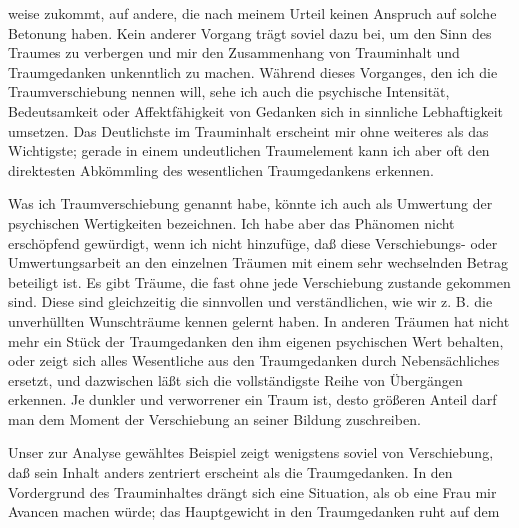 \documentclass[twoside=true,titlepage=false,open=any, parskip=never, fontsize=10pt, headings=small, chapterprefix=false, appendixprefix=false]{scrbook}
\begin{document}
         
            
            
            
        \pstart
        weise zukommt, auf andere, die nach meinem
                  Urteil keinen Anspruch auf solche Betonung haben. Kein anderer Vorgang trägt
               soviel dazu bei, um den Sinn des Traumes zu verbergen und mir den
               Zusammenhang von Trauminhalt und Traumgedanken unkenntlich zu machen.
               Während dieses Vorganges, den ich die Traumverschiebung nennen
               will, sehe ich auch die psychische Intensität, Bedeutsamkeit oder
               Affektfähigkeit von Gedanken sich in sinnliche Lebhaftigkeit
               umsetzen. Das Deutlichste im Trauminhalt erscheint mir ohne weiteres als das
               Wichtigste; gerade in einem undeutlichen Traumelement kann ich aber oft den
               direktesten Abkömmling des wesentlichen Traumgedankens erkennen.
        \pend
    
            
        \pstart
        Was ich Traumverschiebung genannt habe, könnte ich auch als Umwertung der psychischen Wertigkeiten
               bezeichnen. Ich habe aber das Phänomen nicht erschöpfend gewürdigt,
               wenn ich nicht hinzufüge, daß diese Verschiebungs- oder Umwertungsarbeit an den
               einzelnen Träumen mit einem sehr wechselnden Betrag beteiligt ist. Es gibt
               Träume, die fast ohne jede Verschiebung zustande gekommen sind. Diese sind
               gleichzeitig die sinnvollen und verständlichen, wie wir z. B. die
               unverhüllten Wunschträume kennen gelernt haben. In anderen Träumen hat
               nicht mehr ein Stück der Traumgedanken den ihm eigenen psychischen Wert
               behalten, oder zeigt sich alles Wesentliche aus den Traumgedanken durch
               Nebensächliches ersetzt, und dazwischen läßt sich die vollständigste Reihe von
               Übergängen erkennen. Je dunkler und verworrener ein Traum ist, desto
               größeren Anteil darf man dem Moment der Verschiebung an seiner Bildung
               zuschreiben.
        \pend
    
            
        \pstart
        Unser zur Analyse gewähltes Beispiel zeigt wenigstens soviel von Verschiebung,
               daß sein Inhalt anders zentriert erscheint als
               die Traumgedanken. In den Vordergrund des Trauminhaltes drängt sich eine
               Situation, als ob eine Frau mir Avancen machen würde; das Hauptgewicht in den
               Traumgedanken ruht auf dem
        \pend
    
\end{document}
